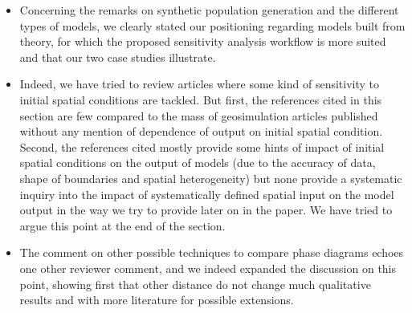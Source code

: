 \documentclass[11pt,a4paper,sans]{moderncv}        %
\begin{document}
\begin{itemize}
	\item Concerning the remarks on synthetic population generation and the different types of models, we clearly stated our positioning regarding models built from theory, for which the proposed sensitivity analysis workflow is more suited and that our two case studies illustrate.
	
	\item Indeed, we have tried to review articles where some kind of sensitivity to initial spatial conditions are tackled. But first, the references cited in this section are few compared to the mass of geosimulation articles published without any mention of dependence of output on initial spatial condition. Second, the references cited mostly provide some hints of impact of initial spatial conditions on the output of models (due to the accuracy of data, shape of boundaries and spatial heterogeneity) but none provide a systematic inquiry into the impact of systematically defined spatial input on the model output in the way we try to provide later on in the paper. We have tried to argue this point at the end of the section.
	
	\item The comment on other possible techniques to compare phase diagrams echoes one other reviewer comment, and we indeed expanded the discussion on this point, showing first that other distance do not change much qualitative results and with more literature for possible extensions. 
	

\end{itemize}
\end{document}

